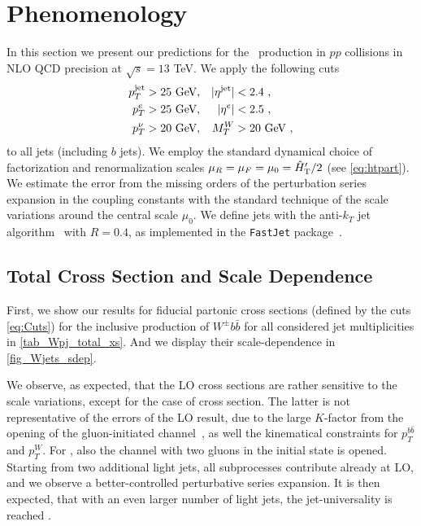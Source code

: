 \section{Phenomenology}
\label{sec:wbb:pheno}
In this section we present our predictions for the \Wbbn~production in
$pp$ collisions in NLO QCD precision at $\sqrt{s}=13$ TeV. 
We apply the following cuts
\begin{align}
  p_T^{\text{jet}}&>25\text{ GeV},& |\eta^{\text{jet}}|&<2.4\ ,\notag\\
  p_T^{e}&>25\text{ GeV},& |\eta^{e}|&<2.5\ ,\notag\\
  p_T^{\nu}&>20\text{ GeV},& M_T^W &> 20\text{ GeV}\ ,
  \label{eq:Cuts}
\end{align}
to all jets (including $b$ jets).
We employ the standard dynamical choice of factorization and renormalization scales $\mu_R=\mu_F=\mu_0={\hat H}_{\mathrm T}'/2$ (see \cref{eq:htpart}).
We estimate the error from the missing orders of the perturbation series expansion in the coupling constants with the standard technique of
the scale variations around the central scale $\mu_0$. 
We define jets with the anti-$k_T$ jet algorithm~\cite{antikT} with $R=0.4$, as implemented in the
\texttt{FastJet} package~\cite{Cacciari:2011ma}.

\subsection{Total Cross Section and Scale Dependence}
\label{totalxsw}
First, we show our results for fiducial partonic cross sections (defined by the cuts \cref{eq:Cuts})
for the inclusive production of $W^{\pm}b\bar{b}$ for all considered jet multiplicities in \cref{tab_Wpj_total_xs}.
And we display their scale-dependence in \cref{fig_Wjets_sdep}.

We observe, as expected, that the LO cross sections are rather sensitive to the scale variations,
except for the case of \Wbb{} cross section.
The latter is not representative of the errors of the LO result, due
to the large $K$-factor from the opening of the gluon-initiated channel~\cite{Ellis:1998fv,FebresCordero:2006sj,Cordero:2009kv},
as well the kinematical constraints for $p_T^{b\bar b}$ and $p_T^W$.
For \Wbbj{}, also the channel with two gluons in the initial state is opened.
Starting from two additional light jets, all subprocesses contribute already at LO,
and we observe a better-controlled perturbative series expansion.
It is then expected, that with an even larger number of light jets,
the jet-universality is reached \cite{BH:Wratios,BH:W5j}.


